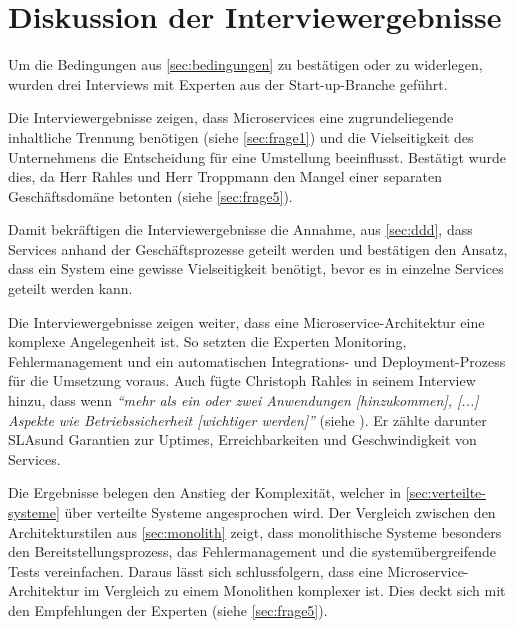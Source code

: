 \section{Diskussion der Interviewergebnisse}
\label{sec:auswertung}

Um die Bedingungen aus \cref{sec:bedingungen} zu bestätigen oder zu widerlegen, wurden drei Interviews mit Experten aus der Start-up-Branche geführt.

Die Interviewergebnisse zeigen, dass Microservices eine zugrundeliegende inhaltliche Trennung benötigen (siehe \cref{sec:frage1}) und die Vielseitigkeit des Unternehmens die Entscheidung für eine Umstellung beeinflusst. Bestätigt wurde dies, da Herr Rahles und Herr Troppmann den Mangel einer separaten Geschäftsdomäne betonten (siehe \cref{sec:frage5}).

\label{sec:vielseitigkeit}
Damit bekräftigen die Interviewergebnisse die Annahme, aus \cref{sec:ddd}, dass Services anhand der Geschäftsprozesse geteilt werden und bestätigen den Ansatz, dass ein System eine gewisse Vielseitigkeit benötigt, bevor es in einzelne Services geteilt werden kann.

Die Interviewergebnisse zeigen weiter, dass eine Microservice-Architektur eine komplexe Angelegenheit ist. So setzten die Experten Monitoring, Fehlermanagement und ein automatischen Integrations- und Deployment-Prozess 
 für die Umsetzung voraus. Auch fügte Christoph Rahles in seinem Interview hinzu, dass wenn \textit{\enquote{mehr als ein oder zwei Anwendungen [hinzukommen], [...] Aspekte wie Betriebssicherheit [wichtiger werden]}} (siehe ). Er zählte darunter SLAs\footnotemark und Garantien zur Uptimes, Erreichbarkeiten und Geschwindigkeit von Services.

Die Ergebnisse belegen den Anstieg der Komplexität, welcher in \cref{sec:verteilte-systeme} über verteilte Systeme angesprochen wird. Der Vergleich zwischen den Architekturstilen aus \cref{sec:monolith} zeigt, dass monolithische Systeme besonders den Bereitstellungsprozess, das Fehlermanagement und die systemübergreifende Tests vereinfachen. Daraus lässt sich schlussfolgern, dass eine Microservice-Architektur im Vergleich zu einem Monolithen komplexer ist. Dies deckt sich mit den Empfehlungen der Experten (siehe \cref{sec:frage5}).

